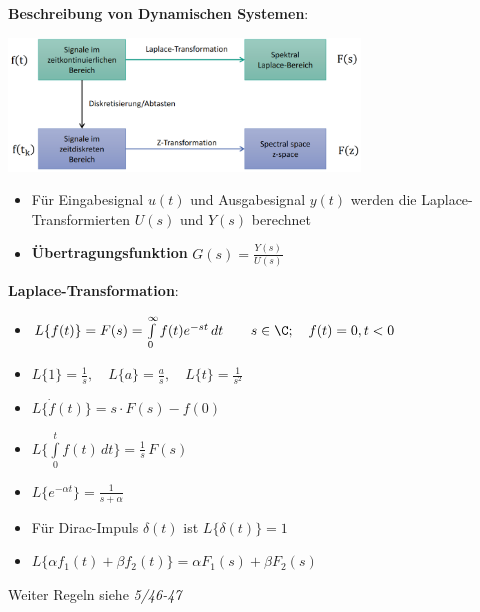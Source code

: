 \textbf{Beschreibung von Dynamischen Systemen}:
\begin{center}
	\includegraphics[width=0.7\textwidth]{images/trans.png}
\end{center}
\begin{itemize}
	\item Für Eingabesignal $u(t)$ und Ausgabesignal $y(t)$ werden die Laplace-Transformierten $U(s)$ und $Y(s)$ berechnet
	\item \textbf{Übertragungsfunktion} $G(s)=\frac{Y(s)}{U(s)}$
\end{itemize}
\bigskip
\textbf{Laplace-Transformation}:
\begin{itemize}
	\item $L\{f(t)\}=F(s)=\int\limits_0^{\infty} f(t)e^{-st}\, dt\qquad s\in\C; \quad f(t)=0,t<0$
	\item $L\{1\}=\frac{1}{s}, \quad L\{a\}=\frac{a}{s}, \quad L\{t\}=\frac{1}{s^2}$
	\item $L\{\dot{f}(t)\}=s\cdot F(s)-f(0)$
	\item $L\{\int\limits_0^{t}f(t)\,dt\}=\frac{1}{s}\,F(s)$
	\item $L\{e^{-\alpha t}\}=\frac{1}{s+\alpha}$
	\item Für Dirac-Impuls $\delta(t)$ ist $L\{\delta(t)\}=1$
	\item $L\{\alpha f_1(t)+\beta f_2(t)\}=\alpha F_1(s)+\beta F_2(s)$
\end{itemize}
Weiter Regeln siehe \textit{5/46-47}
\pagebreak

